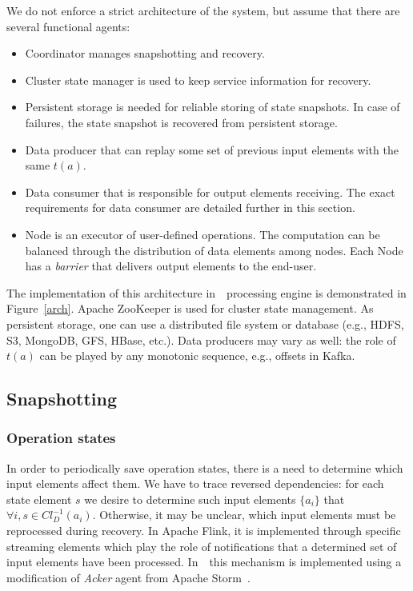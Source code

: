 We do not enforce a strict architecture of the system, but assume that there are several functional agents:
\begin{itemize}
    \item Coordinator manages snapshotting and recovery.
    \item Cluster state manager is used to keep service information for recovery.
    \item Persistent storage is needed for reliable storing of state snapshots. In case of failures, the state snapshot is recovered from persistent storage.
    \item Data producer that can replay some set of previous input elements with the same $t(a)$.
    \item Data consumer that is responsible for output elements receiving. The exact requirements for data consumer are detailed further in this section.
    \item Node is an executor of user-defined operations. The computation can be balanced through the distribution of data elements among nodes. Each Node has a {\em barrier} that delivers output elements to the end-user.
\end{itemize}

The implementation of this architecture in~\FlameStream\ processing engine is demonstrated in Figure~\ref{arch}. Apache ZooKeeper is used for cluster state management. As persistent storage, one can use a distributed file system or database (e.g., HDFS, S3, MongoDB, GFS, HBase, etc.). Data producers may vary as well: the role of $t(a)$ can be played by any monotonic sequence, e.g., offsets in Kafka.

\subsection{Snapshotting}

\subsubsection{Operation states}

In order to periodically save operation states, there is a need to determine which input elements affect them. 
 We have to trace reversed dependencies: for each state element $s$ we desire to determine such input elements $\{a_i\}$ that $\forall i, s \in Cl_D^{-1}(a_i)$. Otherwise, it may be unclear, which input elements must be reprocessed during recovery. In Apache Flink, it is implemented through specific streaming elements which play the role of notifications that a determined set of input elements have been processed. In~\FlameStream\ this mechanism is implemented using a modification of {\em Acker} agent from Apache Storm~\cite{apache:storm}. 

